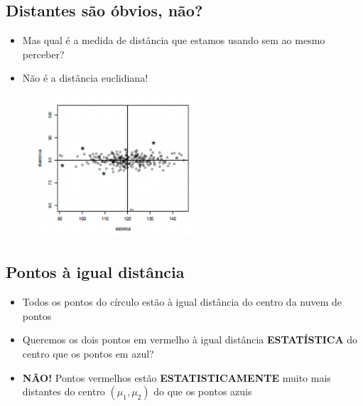 \documentclass[
  letterpaper,
  DIV=11,
  numbers=noendperiod]{scrartcl}
\providecommand{\tightlist}{%
  \setlength{\itemsep}{0pt}\setlength{\parskip}{0pt}}\usepackage{longtable,booktabs,array}
\begin{document}
\hypertarget{distantes-suxe3o-uxf3bvios-nuxe3o}{%
\subsection{Distantes são óbvios,
não?}\label{distantes-suxe3o-uxf3bvios-nuxe3o}}

\begin{itemize}
\tightlist
\item
  Mas qual é a medida de distância que estamos usando sem ao mesmo
  perceber?
\item
  Não é a distância euclidiana!
\end{itemize}

\begin{figure}

{\centering \includegraphics[width=0.55\textwidth,height=\textheight]{figs/Aula07/distancia_pressao2.png}

}

\end{figure}

\hypertarget{pontos-uxe0-igual-distuxe2ncia}{%
\subsection{Pontos à igual
distância}\label{pontos-uxe0-igual-distuxe2ncia}}

\begin{itemize}
\tightlist
\item
  Todos os pontos do círculo estão à igual distância do centro da nuvem
  de pontos
\item
  Queremos os dois pontos em vermelho à igual distância
  \textbf{ESTATÍSTICA} do centro que os pontos em azul?
\item
  \textbf{NÃO!} Pontos vermelhos estão \textbf{ESTATISTICAMENTE} muito
  mais distantes do centro \((\mu_1, \mu_2)\) do que os pontos azuis
\end{itemize}
\end{document}
